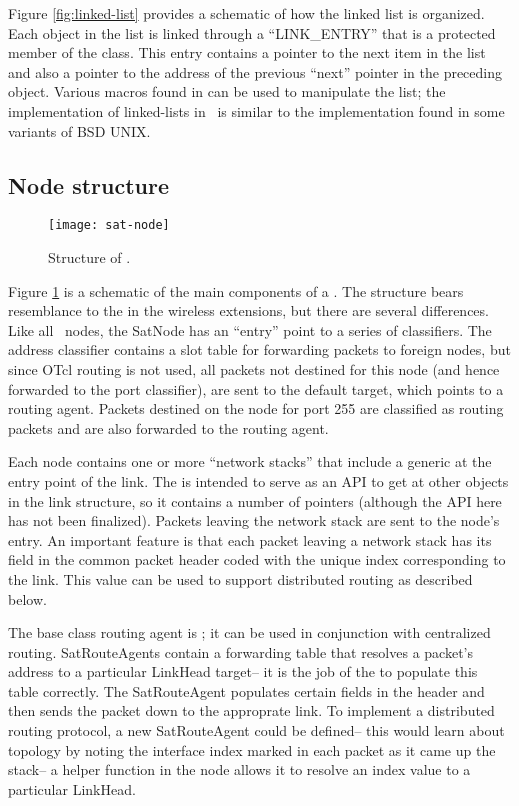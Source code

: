 Figure \ref{fig:linked-list} provides a schematic of how the linked list
is organized.  Each object in the list is linked through a ``LINK\_ENTRY''
that is a protected member of the class.  This entry contains a pointer
to the next item in the list and also a pointer to the address of the
previous ``next'' pointer in the preceding object.   Various macros
found in  can be used to manipulate the list; the 
implementation of linked-lists in \ns~is similar to the  
implementation found in some variants of BSD UNIX.

\subsection{Node structure}

\begin{figure}
    \centerline{\texttt{[image: sat-node]}}
    \caption{Structure of .}
    \label{fig:sat-node}
\end{figure}

Figure \ref{fig:sat-node} is a schematic of the main components of a
.  The structure bears resemblance to the 
in the wireless extensions, but there are several differences.  Like all
\ns~nodes, the SatNode has an ``entry'' point to a series of classifiers.
The address classifier contains a slot table for forwarding packets to 
foreign nodes, but since OTcl routing is not used, all packets not destined
for this node (and hence forwarded to the port classifier), are sent to
the default target, which points to a routing agent.  Packets destined
on the node for port 255 are classified as routing packets and are also
forwarded to the routing agent.

Each node contains one or more ``network stacks'' that include a generic
 at the entry point of the link.  The 
is intended to serve as an API to get at other objects in the link structure,
so it contains a number of pointers (although the API here has not been
finalized).  Packets leaving the network stack are sent to the node's
entry.  An important feature is that each packet leaving a network stack
has its  field in the common packet header coded with the
unique  index corresponding to the link.  This value
can be used to support distributed routing as described below.

The base class routing agent is ; it can be used 
in conjunction with centralized routing.  SatRouteAgents contain
a forwarding table that resolves a packet's address to a particular 
LinkHead target-- it is the job of the  to populate this
table correctly.  The SatRouteAgent populates certain fields in the header
and then sends the packet down to the approprate link.  To implement
a distributed routing protocol, a new SatRouteAgent could be defined-- this
would learn about topology by noting the interface index marked in each 
packet as it came up the stack-- a helper function in the node 
 allows it to resolve an index value to
a particular LinkHead. 

